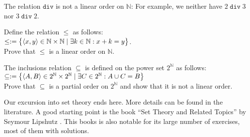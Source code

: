 The relation  $\mathtt{div}$ is not a linear order on $\mathbb{N}$:  For example, we
neither have $2 \mathop{\mathtt{div}} 3$ nor $3 \mathop{\mathtt{div}} 2$.  \exend

\exercise
Define the relation  $\leq$ 
as follows: 
\\[0.2cm]
\hspace*{1.3cm}
$\leq := \bigl\{ \pair(x,y) \in \mathbb{N} \times \mathbb{N} \mid \exists k \in \mathbb{N}: x + k = y \bigr\}$.
\\[0.2cm]
Prove that $\leq$ is a linear order on  $\mathbb{N}$.
\exend

\exercise
The inclusions relation $\subseteq$ is defined on  the power set $2^\mathbb{N}$ as follows:
\\[0.2cm]
\hspace*{1.3cm}
$\subseteq := 
\bigl\{ \pair(A,B) \in 2^\mathbb{N} \times 2^\mathbb{N}\mid \exists C \in 2^\mathbb{N}: A \cup C = B \bigr\}$
\\[0.2cm]
Prove that  $\subseteq$ is a partial order on $2^\mathbb{N}$ and show that it is not a
linear order.
\exend
\next

\noindent
Our excursion into set theory ends here.  More details can be found in the literature.
A good starting point is the book ``Set Theory and Related Topics'' by Seymour Lipshutz
\cite{lipschutz98}.  This books is also notable for its large number of exercises, most of
them with solutions.


